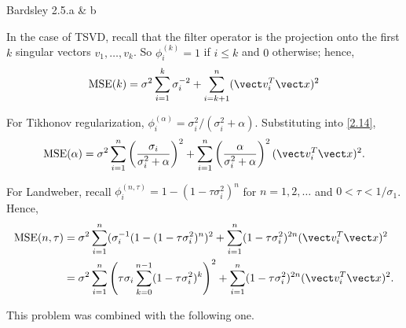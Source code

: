 \documentclass{homework}
\begin{document}
\begin{longproblem}Bardsley 2.5.a \& b 


\begin{solution}
  In the case of TSVD, recall that the filter operator is the projection onto the first $k$ singular vectors $v_1,\dots,v_k$.  So $\phi_i^{(k)} = 1$ if $i \le k$ and $0$ otherwise; hence,
  $$
    \mathrm{MSE}(k) =\sigma^2\sum_{i=1}^k\sigma_i^{-2} + \sum_{i=k+1}^n (\vect v_i^T \vect x)^2 
  $$

  For Tikhonov regularization, $\phi_i^{(\alpha)} = \sigma_i^2/(\sigma_i^2 + \alpha)$.  Substituting into \eqref{2.14},
  $$
    \mathrm{MSE}(\alpha) = \sigma^2\sum_{i=1}^n\left(\frac{\sigma_i}{\sigma_i^2 + \alpha}\right)^2 + \sum_{i=1}^n \left( \frac{\alpha}{\sigma_i^2 + \alpha}\right)^2 (\vect v_i^T \vect x)^2.
  $$

  For Landweber, recall $\phi_i^{(n,\tau)} = 1 - (1 - \tau \sigma_i^2)^n$ for $n=1,2,\dots$ and $0<\tau<1/\sigma_1$. Hence,
  \begin{align*}
    \mathrm{MSE}(n,\tau) &= \sigma^2\sum_{i=1}^n(\sigma_i^{-1}(1 - (1 - \tau\sigma_i^2)^n)^2 + \sum_{i=1}^n (1 - \tau \sigma_i^2)^{2n} (\vect v_i^T \vect x)^2\\
    &= \sigma^2\sum_{i=1}^n\left(\tau \sigma_i \sum_{k=0}^{n-1}(1-\tau\sigma_i^2)^k\right)^2 + \sum_{i=1}^n (1 - \tau \sigma_i^2)^{2n} (\vect v_i^T \vect x)^2.\\  \end{align*}
\end{solution}


This problem was combined with the following one.

\end{longproblem}
\end{document}
